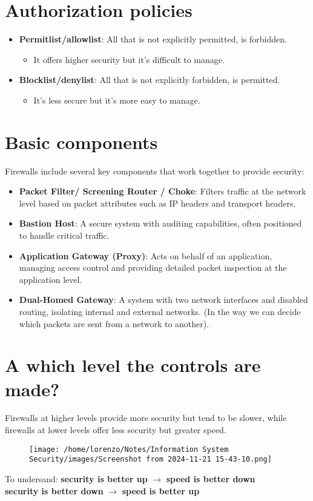 \section{Authorization policies}
\begin{itemize}
    \item \textbf{Permitlist/allowlist}: All that is not explicitly permitted, is forbidden. 
    \begin{itemize}
        \item It offers higher security but it's difficult to manage. 
    \end{itemize}
    \item \textbf{Blocklist/denylist}: All that is not explicitly forbidden, is permitted.
    \begin{itemize}
        \item It's less secure but it's more easy to manage. 
    \end{itemize}
\end{itemize}

\section{Basic components}
Firewalls include several key components that work together to provide security:
\begin{itemize}
    \item \textbf{Packet Filter/ Screening Router / Choke}: Filters traffic at the network level based on packet attributes such as IP headers and transport headers.
    \item \textbf{Bastion Host}: A secure system with auditing capabilities, often positioned to handle critical traffic.
    \item \textbf{Application Gateway (Proxy)}:  Acts on behalf of an application, managing access control and providing detailed packet inspection at the application level.
    \item \textbf{Dual-Homed Gateway}:  A system with two network interfaces and disabled routing, isolating internal and external networks. (In the way we can decide which packets are sent from a network to another).
\end{itemize}

\section{A which level the controls are made?}
Firewalls at higher levels provide more security but tend to be slower, while firewalls at lower levels offer less security but greater speed.
\begin{figure}[h]
    \centering
    \texttt{[image: /home/lorenzo/Notes/Information System Security/images/Screenshot from 2024-11-21 15-43-10.png]}
\end{figure}
\begin{quotebox-yellow}{To undersand:}
    \textbf{security is better up} \(\rightarrow\) \textbf{speed is better down}\\
    \textbf{security is better down} \(\rightarrow\) \textbf{speed is better up}
\end{quotebox-yellow}


